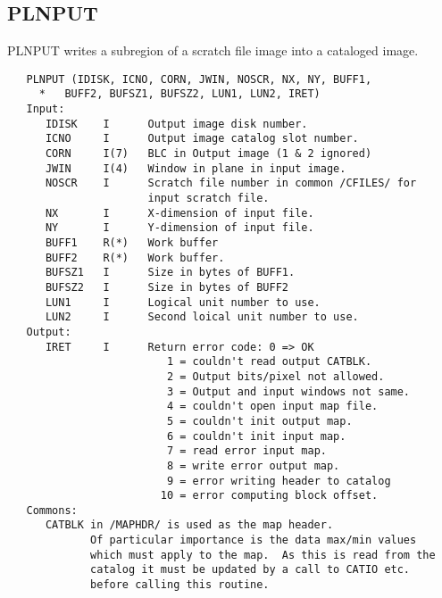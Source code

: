 \subsection{PLNPUT}
PLNPUT writes a subregion of a  scratch file image into a cataloged
image.
\begin{verbatim}
   PLNPUT (IDISK, ICNO, CORN, JWIN, NOSCR, NX, NY, BUFF1,
     *   BUFF2, BUFSZ1, BUFSZ2, LUN1, LUN2, IRET)
   Input:
      IDISK    I      Output image disk number.
      ICNO     I      Output image catalog slot number.
      CORN     I(7)   BLC in Output image (1 & 2 ignored)
      JWIN     I(4)   Window in plane in input image.
      NOSCR    I      Scratch file number in common /CFILES/ for
                      input scratch file.
      NX       I      X-dimension of input file.
      NY       I      Y-dimension of input file.
      BUFF1    R(*)   Work buffer
      BUFF2    R(*)   Work buffer.
      BUFSZ1   I      Size in bytes of BUFF1.
      BUFSZ2   I      Size in bytes of BUFF2
      LUN1     I      Logical unit number to use.
      LUN2     I      Second loical unit number to use.
   Output:
      IRET     I      Return error code: 0 => OK
                         1 = couldn't read output CATBLK.
                         2 = Output bits/pixel not allowed.
                         3 = Output and input windows not same.
                         4 = couldn't open input map file.
                         5 = couldn't init output map.
                         6 = couldn't init input map.
                         7 = read error input map.
                         8 = write error output map.
                         9 = error writing header to catalog
                        10 = error computing block offset.
   Commons:
      CATBLK in /MAPHDR/ is used as the map header.
             Of particular importance is the data max/min values
             which must apply to the map.  As this is read from the
             catalog it must be updated by a call to CATIO etc.
             before calling this routine.
\end{verbatim}

